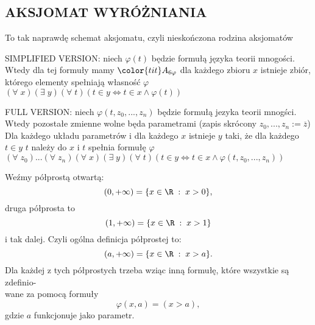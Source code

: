 \documentclass{article}
\begin{document}
\subsection{AKSJOMAT WYRÓŻNIANIA}
To tak naprawdę schemat aksjomatu, czyli nieskończona rodzina aksjomatów
\begin{center}\large
    {\color{def}SIMPLIFIED VERSION:} niech $\varphi(t)$ będzie formułą języka teorii mnogości. Wtedy dla tej formuły mamy $\color{tit}A_{6\varphi}$ dla każdego zbioru $x$ istnieje zbiór, którego elementy spełniają własność $\varphi$\smallskip\\
    $(\forall\;x)(\exists\;y)(\forall\;t)(t\in y\iff t\in x\land \varphi(t))$
\end{center}\bigskip
\begin{center}\large
    {\color{def}FULL VERSION:} niech $\varphi(t, z_0, ..., z_n)$ będzie formułą jezyka teorii mnogści. Wtedy pozostałe zmienne wolne będa parametrami (zapis skrócony $z_0, ..., z_n:= \overline z$)\smallskip\\
    Dla każdego układu parametrów i dla każdego $x$ istnieje $y$ taki, że dla każdego $t\in y$ $t$ należy do $x$ i $t$ spełnia formułę $\varphi$\smallskip\\
    $(\forall\;z_0)...(\forall\;z_n)(\forall\;x)(\exists\;y)(\forall\;t)(t\in y\iff t\in x\land \varphi(t, z_0, ..., z_n))$
\end{center}\bigskip
Weźmy półprostą otwartą:
$$(0, +\infty)=\{x\in\R\;:\;x>0\},$$
druga półprosta to
$$(1, +\infty)=\{x\in\R\;:\;x>1\}$$
i tak dalej. Czyli ogólna definicja półprostej to:
$$(a, +\infty)=\{x\in \R\;:\;x>a\}.$$
Dla każdej z tych półprostych trzeba wziąc inną formułę, które wszystkie są zdefinio-\\wane za pomocą formuły
$$\varphi(x, a)=(x>a),$$
gdzie $a$ funkcjonuje jako parametr.
\end{document}
